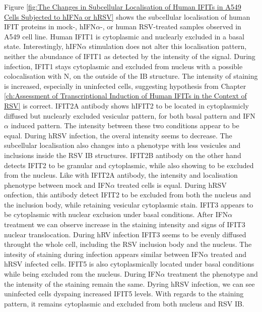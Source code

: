 Figure \ref{fig:The Changes in Subcellular Localisation of Human IFITs in A549 Cells Subjected to hIFNa or hRSV} shows the subcellular localisation of human IFIT proteins in mock-, hIFN\(\alpha\)-, or human RSV-treated samples observed in A549 cell line. Human IFIT1 is cytoplasmic and nuclearly excluded in a basal state. Interestingly, hIFN\(\alpha\) stimulation does not alter this localisation pattern, neither the abundance of IFIT1 as detected by the intensity of the signal. During infection, IFIT1 stays cytoplasmic and excluded from nucleus with a possible colocalisation with N, on the outside of the IB structure. The intensity of staining is increased, especially in uninfected cells, suggesting hypothesis from Chapter \ref{ch:Assessment of Transcriptional Induction of Human IFITs in the Context of RSV} is correct. IFIT2A antibody shows hIFIT2 to be located in cytoplasmicly diffused but nuclearly excluded vesicular pattern, for both basal pattern and IFN\(\alpha\) induced pattern. The intensity between these two conditions appear to be equal. During hRSV infection, the overal intensity seems to decrease. The subcellular localisation also changes into a phenotype with less vesicules and inclusions inside the RSV IB structures. IFIT2B antibody on the other hand detects IFIT2 to be granular and cytoplasmic, while also showing to be excluded from the nucleus. Like with IFIT2A antibody, the intensity and localisation phenotype between mock and IFN\(\alpha\) treated cells is equal. During hRSV onfection, this antibody detect IFIT2 to be excluded from both the nucleus and the inclusion body, while retaining vesicular cytoplasmic stain. IFIT3 appears to be cytoplasmic with nuclear exclusion under basal conditions. After IFN\(\alpha\) treatment we can observe increase in the staining intensity and signs of IFIT3 nuclear translocation. During hRV infection IFIT3 seems to be evenly diffused throught the whole cell, including the RSV inclusion body and the nucleus. The intesity of staining during infection appears similar between IFN\(\alpha\) treated and hRSV infected cells. IFIT5 is also cytoplasmically located under basal conditions while being excluded rom the nucleus. During IFN\(\alpha\) treatment the phenotype and the intensity of the staining remain the same. Dyring hRSV infection, we can see uninfected cells dyspaing increased IFIT5 levels. With regards to the staining pattern, it remains cytoplasmic and excluded from both nucleus and RSV IB.

